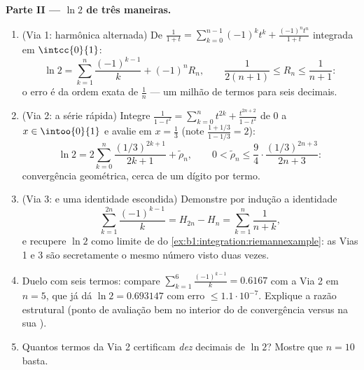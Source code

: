 \begin{problem}
\medskip
\noindent\textbf{Parte II --- $\ln 2$ de três maneiras.}
\begin{enumerate}[resume]
  \item (Via 1: harmônica alternada) De $\frac{1}{1+t} =
        \sum_{k=0}^{n-1}(-1)^k t^k + \frac{(-1)^n t^n}{1+t}$
        integrada em $\intcc{0}{1}$:
        \[
        \ln 2 = \sum_{k=1}^{n} \frac{(-1)^{k-1}}{k} + (-1)^n
        R_n, \qquad \frac{1}{2(n+1)} \leq R_n \leq
        \frac{1}{n+1} :
        \]
        o erro é da ordem exata de $\frac 1n$ --- um milhão de
        termos para seis decimais.
  \item (Via 2: a série rápida) Integre $\frac{1}{1 - t^2} =
        \sum_{k=0}^{n} t^{2k} + \frac{t^{2n+2}}{1-t^2}$ de $0$
        a $x \in \intoo{0}{1}$ e avalie em $x = \frac13$
        (note $\frac{1 + 1/3}{1 - 1/3} = 2$):
        \[
        \ln 2 = 2\sum_{k=0}^{n} \frac{(1/3)^{2k+1}}{2k+1} +
        \tilde\rho_n,
        \qquad
        0 < \tilde\rho_n \leq \frac{9}{4}\cdot
        \frac{(1/3)^{2n+3}}{2n+3} :
        \]
        convergência geométrica, cerca de um dígito por termo.
  \item (Via 3:  e uma identidade escondida) Demonstre
        por indução a identidade
        \[
        \sum_{k=1}^{2n} \frac{(-1)^{k-1}}{k} = H_{2n} - H_n =
        \sum_{k=1}^{n} \frac{1}{n + k} ,
        \]
        e recupere $\ln 2$ como limite de  do
        \cref{ex:b1:integration:riemannexample}: as Vias 1 e 3
        são secretamente o mesmo número visto duas vezes.
  \item Duelo com seis termos: compare $\sum_{k=1}^{6}
        \frac{(-1)^{k-1}}{k} = 0.6167$ com a Via 2 em $n = 5$,
        que já dá $\ln 2 = 0.693147$ com erro $\leq
        1.1\cdot10^{-7}$. Explique a razão estrutural
        (ponto de avaliação bem no interior do  de
        convergência versus na sua ).
  \item Quantos termos da Via 2 certificam \emph{dez} decimais de
        $\ln 2$? Mostre que $n = 10$ basta.
\end{enumerate}


\end{problem}
